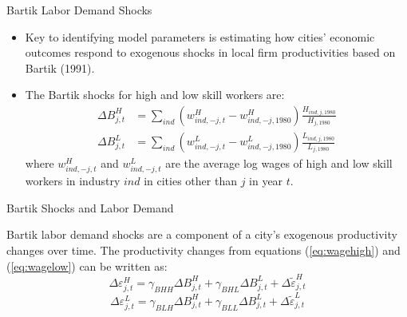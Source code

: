 \documentclass[aspectratio=169]{beamer}
\begin{document}
\begin{frame}{Bartik Labor Demand Shocks}

\begin{itemize}
    \item<1->  Key to identifying model parameters is estimating how cities’ economic outcomes respond to exogenous shocks in local firm productivities based on Bartik (1991).
    \item<2-> The Bartik shocks for high and low skill workers are:
    \begin{equation*}
        \begin{split}
            \Delta B_{j,t}^{H} &= \sum_{ind}\left( w_{ind, -j,t}^{H} - w_{ind, -j,1980}^{H} \right) \frac{H_{ind,j,1980}}{H_{j,1980}} \\
            \Delta B_{j,t}^{L} &= \sum_{ind}\left( w_{ind, -j,t}^{L} - w_{ind, -j,1980}^{L} \right) \frac{L_{ind,j,1980}}{L_{j,1980}}
        \end{split}
    \end{equation*}
    where $ w_{ind, -j,t}^{H} $ and $ w_{ind, -j,t}^{L} $ are the average log wages of high and low skill workers in industry $ ind $ in cities other than $ j $ in year $ t $.
\end{itemize}
    
\end{frame}


\begin{frame}{Bartik Shocks and Labor Demand}

Bartik labor demand shocks are a component of a city’s exogenous productivity changes over time.  The productivity changes from equations (\ref{eq:wagehigh}) and (\ref{eq:wagelow}) can be written as:
\begin{equation}
    \Delta \varepsilon_{j,t}^{H} = \gamma_{BHH} \Delta B_{j,t}^{H} + \gamma_{BHL} \Delta B_{j,t}^{L} + \Delta \tilde{\varepsilon}_{j,t}^{H}
    \label{eq:Bartikshockhigh2}
\end{equation}
\begin{equation}
    \Delta \varepsilon_{j,t}^{L} = \gamma_{BLH} \Delta B_{j,t}^{H} + \gamma_{BLL} \Delta B_{j,t}^{L} + \Delta \tilde{\varepsilon}_{j,t}^{L}
    \label{eq:Bartikshocklow2}
\end{equation}
    
\end{frame}

\end{document}

